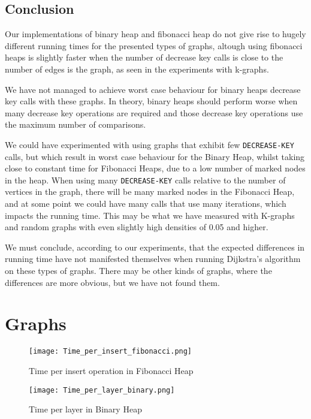 \documentclass[a4paper,10pt]{article}
\begin{document}
\subsection{Conclusion}

Our implementations of binary heap and fibonacci heap do not give rise to hugely different running times for the presented types of graphs, altough using fibonacci heaps is slightly faster when the number of decrease key calls is close to the number of edges is the graph, as seen in the experiments with k-graphs.

We have not managed to achieve worst case behaviour for binary heaps decrease key calls with these graphs. In theory, binary heaps should perform worse when many decrease key operations are required and those decrease key operations use the maximum number of comparisons.

We could have experimented with using graphs that exhibit few \texttt{DECREASE\--KEY} calls, but which result in worst case behaviour for the Binary Heap, whilst taking close to constant time for Fibonacci Heaps, due to a low number of marked nodes in the heap.
When using many \texttt{DECREASE\--KEY} calls relative to the number of vertices in the graph, there will be many marked nodes in the Fibonacci Heap, and at some point we could have many calls that use many iterations, which impacts the running time. This may be what we have measured with K-graphs and random graphs with even slightly high densities of 0.05 and higher.

We must conclude, according to our experiments, that the expected differences in running time have not manifested themselves when running Dijkstra's algorithm on these types of graphs. There may be other kinds of graphs, where the differences are more obvious, but we have not found them.


\clearpage
\appendix 
\section{Graphs}
\begin{figure}[h]    
  \texttt{[image: Time\_per\_insert\_fibonacci.png]}  
  \caption{Time per insert operation in Fibonacci Heap}
  \label{fibonacci-insert-graph}
\end{figure}

\begin{figure}[h]   
  \texttt{[image: Time\_per\_layer\_binary.png]}
  \caption{Time per layer in Binary Heap}
   \label{binary-insert-layer-graph}
\end{figure}
\end{document}
